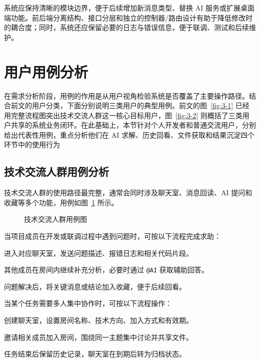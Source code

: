 系统应保持清晰的模块边界，便于后续增加新消息类型、替换 AI 服务或扩展桌面端功能。前后端分离结构、接口分层和独立的控制器/路由设计有助于降低修改时的耦合度；同时，系统还应保留必要的日志与错误信息，便于联调、测试和后续维护。

\section{用户用例分析}

在需求分析阶段，用例的作用是从用户视角检验系统是否覆盖了主要操作路径。结合前文的用户分类，下面分别说明三类用户的典型用例。前文的图~\ref{fig:3-1} 已经用完整流程图突出技术交流人群这一核心目标用户，图~\ref{fig:3-2} 则概括了三类用户共享的系统业务闭环。在此基础上，本节针对个人开发者和普通交流用户，分别给出代表性用例，重点分析他们在 AI 求解、历史回看、文件获取和结果沉淀四个环节中的使用行为

\subsection{技术交流人群用例分析}

技术交流人群的使用路径最完整，通常会同时涉及聊天室、消息回读、AI 提问和收藏等多个功能，用例如图~\ref{fig:3-3} 所示。

\begin{figure}[H]
\centering
{}
\caption{技术交流人群用例图}
\label{fig:3-3}
\end{figure}


当项目成员在开发或联调过程中遇到问题时，可按以下流程完成求助：
\begin{usecaselist}
\item 进入对应聊天室，发送问题描述、报错日志和相关代码片段。
\item 其他成员在房间内继续补充分析，必要时通过 \texttt{@AI} 获取辅助回答。
\item 问题解决后，将关键消息或结论加入收藏，便于后续回看。
\end{usecaselist}


当某个任务需要多人集中协作时，可按以下流程操作：
\begin{usecaselist}
\item 创建聊天室，设置房间名称、技术方向、加入方式和有效期。
\item 邀请相关成员加入房间，围绕同一主题集中讨论并共享文件。
\item 任务结束后保留历史记录，聊天室在到期后转为归档状态。
\end{usecaselist}

